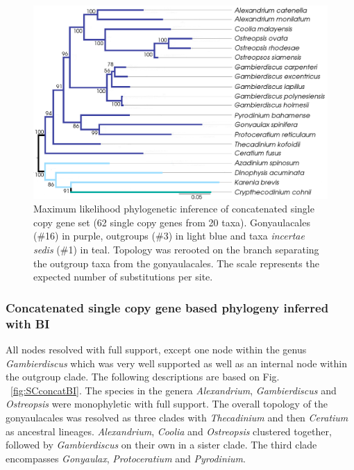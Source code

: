 \documentclass[fleqn,10pt,lineno]{wlpeerj} %
\begin{document}
\begin{figure}[ht]
\centering
\includegraphics[width=\linewidth]{gonya-figs/SC-concat-ML-WAG.png} 
\caption{Maximum likelihood phylogenetic inference of concatenated single copy gene set (62 single copy genes from 20 taxa). Gonyaulacales (\#16) in purple, outgroups (\#3) in light blue and taxa \textit{incertae sedis} (\#1) in teal. Topology was rerooted on the branch separating the outgroup taxa from the gonyaulacales. The scale represents the expected number of substitutions per site.} 
\label{fig:SCconcatML}
\end{figure} 

\subsubsection*{Concatenated single copy gene based phylogeny inferred with BI}
All nodes resolved with full support, except one node within the genus \textit{Gambierdiscus} which was very well supported as well as an internal node within the outgroup clade. 
The following descriptions are based on Fig. ~\ref{fig:SCconcatBI}. 
The species in the genera \textit{Alexandrium}, \textit{Gambierdiscus} and \textit{Ostreopsis} were monophyletic with full support. 
The overall topology of the gonyaulacales was resolved as three clades with \textit{Thecadinium} and then \textit{Ceratium} as ancestral lineages. 
\textit{Alexandrium}, \textit{Coolia} and \textit{Ostreopsis} clustered together, followed by \textit{Gambierdiscus} on their own in a sister clade. 
The third clade encompasses \textit{Gonyaulax}, \textit{Protoceratium} and \textit{Pyrodinium}. 
\end{document}
